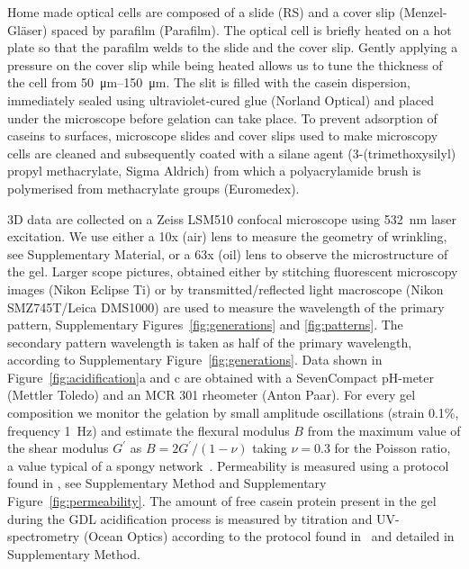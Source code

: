 \documentclass[twocolumn,superscriptaddress,showpacs,preprintnumbers,
amsmath,amssymb,prl]{revtex4-1}
\begin{document}
Home made optical cells are composed of a slide (RS) and a cover slip (Menzel-Gl\"aser) spaced by parafilm (Parafilm). The optical cell is briefly heated on a hot plate so that the parafilm welds to the slide and the cover slip. Gently applying a pressure on the cover slip while being heated allows us to tune the thickness of the cell from \SIrange{50}{150}{\micro\metre}. The slit is filled with the casein dispersion, immediately sealed using ultraviolet-cured glue (Norland Optical) and placed under the microscope before gelation can take place. To prevent adsorption of caseins to surfaces, microscope slides and cover slips used to make microscopy cells are cleaned and subsequently coated with a silane agent (3-(trimethoxysilyl) propyl methacrylate, Sigma Aldrich) from which a polyacrylamide brush is polymerised from methacrylate groups (Euromedex).

3D data are collected on a Zeiss LSM510 confocal microscope using \SI{532}{\nano\meter} laser excitation. We use either a 10x (air) lens to measure the geometry of wrinkling, see Supplementary Material, or a 63x (oil) lens to observe the microstructure of the gel. Larger scope pictures, obtained either by stitching fluorescent microscopy images (Nikon Eclipse Ti) or by transmitted/reflected light macroscope (Nikon SMZ745T/Leica DMS1000) are used to measure the wavelength of the primary pattern, Supplementary Figures~\ref{fig:generations} and \ref{fig:patterns}. The secondary pattern wavelength is taken as half of the primary wavelength, according to Supplementary Figure~\ref{fig:generations}.
Data shown in Figure~\ref{fig:acidification}a and c are obtained with a SevenCompact pH-meter (Mettler Toledo) and an MCR 301 rheometer (Anton Paar). For every gel composition we monitor the gelation by small amplitude oscillations (strain 0.1\%, frequency \SI{1}{\hertz}) and estimate the flexural modulus $B$ from the maximum value of the shear modulus $G^\prime$ as $B=2G^\prime/(1-\nu)$ taking $\nu=0.3$ for the Poisson ratio, a value typical of a spongy network~\cite{Greaves2011}.
Permeability is measured using a protocol found in \cite{VanDijk1986}, see Supplementary Method and Supplementary Figure~\ref{fig:permeability}. The amount of free casein protein present in the gel during the GDL acidification process is measured by titration and UV-spectrometry (Ocean Optics) according to the protocol found in~\cite{Roefs1986} and detailed in Supplementary Method.



\end{document}
